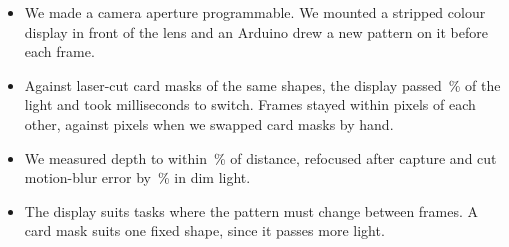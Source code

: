 \begin{itemize}
\item We made a camera aperture programmable. We mounted a stripped colour display in front of the lens and an Arduino drew a new pattern on it before each frame.
\item Against laser-cut card masks of the same shapes, the display passed \,\% of the light and took  milliseconds to switch. Frames stayed within  pixels of each other, against  pixels when we swapped card masks by hand.
\item We measured depth to within \,\% of distance, refocused after capture and cut motion-blur error by \,\% in dim light.
\item The display suits tasks where the pattern must change between frames. A card mask suits one fixed shape, since it passes more light.
\end{itemize}

